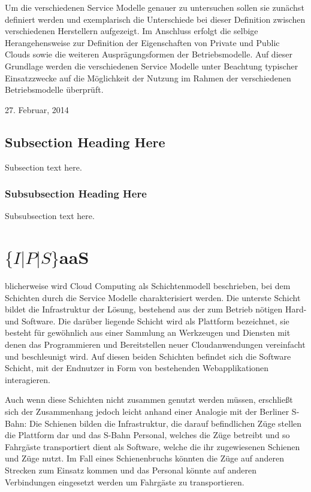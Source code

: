 \documentclass[journal]{IEEEtran}
\begin{document}
Um die verschiedenen Service Modelle genauer zu untersuchen sollen sie zunächst definiert werden und exemplarisch die Unterschiede bei dieser Definition zwischen verschiedenen Herstellern aufgezeigt. Im Anschluss erfolgt die selbige Herangehensweise zur Definition der Eigenschaften von Private und Public Clouds sowie die weiteren Ausprägungsformen der Betriebsmodelle. Auf dieser Grundlage werden die verschiedenen Service Modelle unter Beachtung typischer Einsatzzwecke auf die Möglichkeit der Nutzung im Rahmen der verschiedenen Betriebsmodelle überprüft.

\hfill 27. Februar, 2014

\subsection{Subsection Heading Here}
Subsection text here.


\subsubsection{Subsubsection Heading Here}
Subsubsection text here.


\section{$\{I|P|S\}$aaS}
blicherweise wird Cloud Computing als Schichtenmodell beschrieben, bei dem Schichten durch die Service Modelle charakterisiert werden. Die unterste Schicht bildet die Infrastruktur der Lösung, bestehend aus der zum Betrieb nötigen Hard- und Software. Die darüber liegende Schicht wird als Plattform bezeichnet, sie besteht für gewöhnlich aus einer Sammlung an Werkzeugen und Diensten mit denen das Programmieren und Bereitstellen neuer Cloudanwendungen vereinfacht und beschleunigt wird. Auf diesen beiden Schichten befindet sich die Software Schicht, mit der Endnutzer in Form von bestehenden Webapplikationen interagieren.

Auch wenn diese Schichten nicht zusammen genutzt werden müssen, erschließt sich der Zusammenhang jedoch leicht anhand einer Analogie mit der Berliner S-Bahn: Die Schienen bilden die Infrastruktur, die darauf befindlichen Züge stellen die Plattform dar und das S-Bahn Personal, welches die Züge betreibt und so Fahrgäste transportiert dient als Software, welche die ihr zugewiesenen Schienen und Züge nutzt. Im Fall eines Schienenbruchs könnten die Züge auf anderen Strecken zum Einsatz kommen und das Personal könnte auf anderen Verbindungen eingesetzt werden um Fahrgäste zu transportieren.
\end{document}
